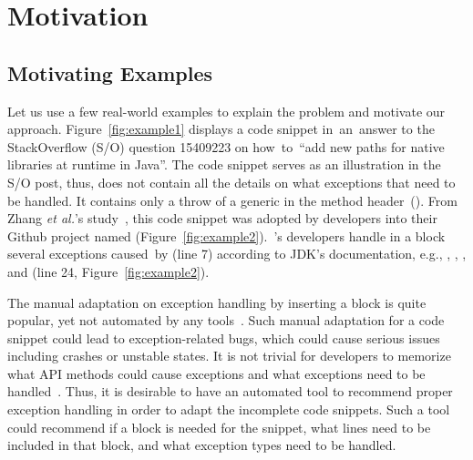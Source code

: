 \section{Motivation}
\label{motiv:sec}

\subsection{Motivating Examples}
\label{examples:sec}



Let us use a few real-world examples to explain the problem and
motivate our approach. Figure~\ref{fig:example1} displays a code
snippet in~an~answer to the StackOverflow (S/O) question 15409223 on
how~to~``add new paths for native libraries at runtime in Java''.  The
code snippet serves as an illustration in the S/O post, thus, does not
contain all the details on what exceptions that need to be handled. It
contains only a throw of a generic  in the method
header~(). From Zhang {\em et al.}'s
study~\cite{zhang-icse19}, this code snippet was adopted by developers
into their Github project named 
(Figure~\ref{fig:example2}).~'s developers handle in a
 block several exceptions caused~by
 (line 7)
according to JDK's documentation, e.g.,
, ,
, and
 (line 24,
Figure~\ref{fig:example2}).

The manual adaptation on exception handling by inserting a
 block is quite popular, yet not automated by any
tools~\cite{zhang-icse19}. Such manual adaptation for a code snippet
could lead to exception-related bugs, which could cause serious issues
including crashes or unstable states. It is not trivial for developers
to memorize what API methods could cause exceptions and what
exceptions need to be handled~\cite{xrank-fse20}. Thus, it is
desirable to have an automated tool to recommend proper exception
handling in order to adapt the incomplete code snippets.  Such a tool
could recommend if a  block is needed for the snippet,
what lines need to be included in that block, and what exception types need
to be handled.


